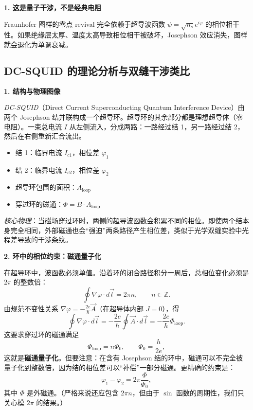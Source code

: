 \begin{insightbox}[举一反三与物理直觉]
\textbf{1. 这是量子干涉，不是经典电阻}

Fraunhofer 图样的零点 revival 完全依赖于超导波函数 $\psi = \sqrt{n_s}e^{i\varphi}$ 的相位相干性。如果绝缘层太厚、温度太高导致相位相干被破坏，Josephson 效应消失，图样就会退化为单调衰减。

\subsection{DC-SQUID 的理论分析与双缝干涉类比}

\textbf{1. 结构与物理图像}

\textit{DC-SQUID}（Direct Current Superconducting Quantum Interference Device）由两个 Josephson 结并联构成一个超导环。超导环的其余部分都是理想超导体（零电阻）。一束总电流 $I$ 从左侧流入，分成两路：一路经过结 1，另一路经过结 2，然后在右侧重新汇合流出。

\begin{itemize}[nosep]
    \item 结 1：临界电流 $I_{c1}$，相位差 $\varphi_1$
    \item 结 2：临界电流 $I_{c2}$，相位差 $\varphi_2$
    \item 超导环包围的面积：$A_{\text{loop}}$
    \item 穿过环的磁通：$\Phi = B \cdot A_{\text{loop}}$
\end{itemize}

\textit{核心物理}：当磁场穿过环时，两侧的超导波函数会积累不同的相位。即使两个结本身完全相同，外部磁通也会``强迫''两条路径产生相位差，类似于光学双缝实验中光程差导致的干涉条纹。

\textbf{2. 环中的相位约束：磁通量子化}

在超导环中，波函数必须单值。沿着环的闭合路径积分一周后，总相位变化必须是 $2\pi$ 的整数倍：
\[
\oint \nabla\varphi \cdot d\vec{l} = 2\pi n, \qquad n \in \mathbb{Z}.
\]
由规范不变性关系 $\nabla\varphi = -\frac{2e}{\hbar}\vec{A}$（在超导体内部 $J=0$），得
\[
\oint \nabla\varphi \cdot d\vec{l} = -\frac{2e}{\hbar}\oint \vec{A}\cdot d\vec{l} = -\frac{2e}{\hbar}\Phi_{\text{loop}}.
\]
这要求穿过环的磁通满足
\[
\Phi_{\text{loop}} = n\Phi_0, \qquad \Phi_0 = \frac{h}{2e},
\]
这就是\textbf{磁通量子化}。但要注意：在含有 Josephson 结的环中，磁通可以不完全被量子化到整数倍，因为结的相位差可以``补偿''一部分磁通。更精确的约束是：
\[
\varphi_1 - \varphi_2 = 2\pi \frac{\Phi}{\Phi_0},
\]
其中 $\Phi$ 是外磁通。（严格来说还应包含 $2\pi n$，但由于 $\sin$ 函数的周期性，我们只关心模 $2\pi$ 的结果。）


\end{insightbox}

